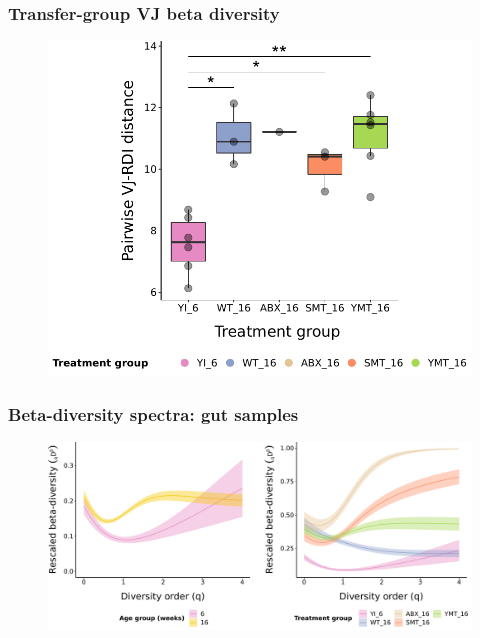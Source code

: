 \documentclass[presentation]{beamer}
\newlength{\slideheight}
\begin{document}
\begin{frame}
\frametitle{Transfer-group VJ beta diversity}
\begin{figure}
\includegraphics[height=\slideheight]{figs/pdf/extra/igseq-gut-VJ-diversity-beta-groups-rdi}
\end{figure}
\end{frame}

\begin{frame}
\frametitle{Beta-diversity spectra: gut samples}
\begin{figure}
\includegraphics[width=\textwidth]{figs/pdf/extra/igseq-gut-VJ-diversity-beta-spectra}
\end{figure}
\end{frame}
\end{document}
